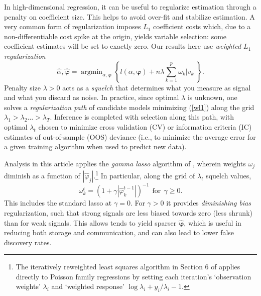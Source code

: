 \documentclass[12pt]{article}
\newcommand{\bs}[1]{\boldsymbol{#1}}
\DeclareMathOperator*{\argmin}{argmin}
\begin{document}
In high-dimensional regression, it can be useful to regularize estimation
through a penalty on coefficient size.   This helps  to avoid over-fit and
stabilize estimation.
A very common form of regularization imposes $L_1$ coefficient costs
\citep[i.e., the lasso of][]{tibshirani_regression_1996} which, due to
a non-differentiable cost spike at the origin, yields variable selection: some
coefficient estimates will be set to exactly zero.  Our results here use {\it
weighted $L_1$ regularization}
\begin{equation}\label{wl1}
 \hat\alpha,\bs{\hat\varphi} = \argmin_{\alpha,\bs{\varphi}} \left\{l(\alpha,\bs{\varphi}) + n \lambda \sum_{k=1}^p \omega_k |v_k |\right\}.
\end{equation}
Penalty size $\lambda>0$ acts as a {\it squelch} that determines what you
measure as signal and what you discard as noise. In practice, since optimal
$\lambda$ is unknown, one solves a {\it regularization path} of candidate
models minimizing (\ref{wl1}) along the grid $\lambda_1 >
\lambda_2 \ldots > \lambda_T$.  Inference is completed with selection
along this path, with optimal $\lambda_t$ chosen to minimize cross validation
(CV) or information criteria (IC) estimates of out-of-sample (OOS) deviance (i.e.,
to minimize the average error for a given training algorithm when used to
predict new data).

Analysis in this article applies the {\it gamma lasso} algorithm  of
\citet{taddy_gamma_2013}, wherein weights $\omega_j$ diminish as a
function of $|\hat\varphi_j|$.\footnote{The iteratively reweighted least
squares algorithm in Section 6 of \citet{taddy_gamma_2013} applies directly to Poisson
family regressions by setting each iteration's `observation weights' $\lambda_i$ and
`weighted response' $\log\lambda_i + y_i/\lambda_i - 1$.}  In particular,
along the grid of $\lambda_t$ squelch values,
\begin{equation}
\omega^{t}_k  = \left(1 + \gamma
|\hat\varphi^{t-1}_k|\right)^{-1} ~~\text{for}~~\gamma \geq 0.
\end{equation} 
This includes the standard lasso at
$\gamma=0$.  For $\gamma>0$ it provides  {\it diminishing bias} regularization,
such that strong signals are less biased towards zero (less shrunk) than for
weak signals. This allows
tends to
yield sparser $\bs{\hat
\varphi}$, which is useful in reducing both storage and communication, and can
also lead to lower false discovery rates.  
\end{document}
